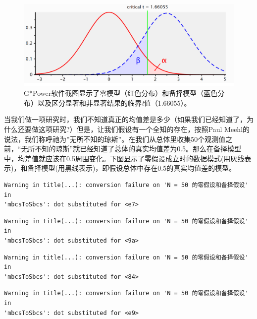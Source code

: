 \documentclass[
  letterpaper,
  DIV=11,
  numbers=noendperiod]{scrreprt}
\begin{document}
\begin{figure}

{\centering \includegraphics[width=1\textwidth,height=\textheight]{images/1.3.3.png}

}

\caption{\label{fig-gpowerscreenshot}G*Power软件截图显示了零模型（红色分布）和备择模型（蓝色分布）以及区分显著和非显著结果的临界\emph{t}值（1.66055）。}

\end{figure}

当我们做一项研究时，我们不知道真正的均值差是多少（如果我们已经知道了，为什么还要做这项研究?）但是，让我们假设有一个全知的存在，按照Paul
Meehl的说法，我们称呼祂为''无所不知的琼斯''。在我们从总体里收集50个观测值之前，``无所不知的琼斯''就已经知道了总体的真实均值差为0.5。那么在备择模型中，均差值就应该在0.5周围变化。下图显示了零假设成立时的数据模式(用灰线表示)，和备择模型(用黑线表示)，即假设总体中存在0.5的真实均值差的模型。

\begin{verbatim}
Warning in title(...): conversion failure on 'N = 50 的零假设和备择假设' in
'mbcsToSbcs': dot substituted for <e7>
\end{verbatim}

\begin{verbatim}
Warning in title(...): conversion failure on 'N = 50 的零假设和备择假设' in
'mbcsToSbcs': dot substituted for <9a>
\end{verbatim}

\begin{verbatim}
Warning in title(...): conversion failure on 'N = 50 的零假设和备择假设' in
'mbcsToSbcs': dot substituted for <84>
\end{verbatim}

\begin{verbatim}
Warning in title(...): conversion failure on 'N = 50 的零假设和备择假设' in
'mbcsToSbcs': dot substituted for <e9>
\end{verbatim}
\end{document}
